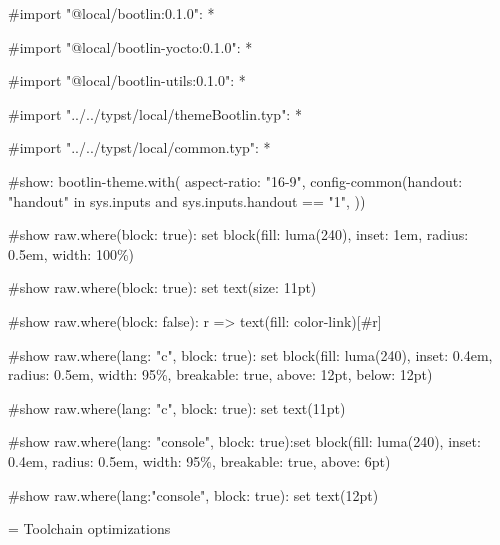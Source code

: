#import "@local/bootlin:0.1.0": *

#import "@local/bootlin-yocto:0.1.0": *

#import "@local/bootlin-utils:0.1.0": *

#import "../../typst/local/themeBootlin.typ": *

#import "../../typst/local/common.typ": *

#show: bootlin-theme.with( aspect-ratio: "16-9", config-common(handout: "handout" in sys.inputs and sys.inputs.handout == "1", ))

#show raw.where(block: true): set block(fill: luma(240), inset: 1em, radius: 0.5em, width: 100\%)

#show raw.where(block: true): set text(size: 11pt)

#show raw.where(block: false): r => text(fill: color-link)[#r]

#show raw.where(lang: "c", block: true): set block(fill: luma(240), inset: 0.4em, radius: 0.5em, width: 95\%, breakable: true, above: 12pt, below: 12pt)

#show raw.where(lang: "c", block: true): set text(11pt)

#show raw.where(lang: "console", block: true):set block(fill: luma(240), inset: 0.4em, radius: 0.5em, width: 95\%, breakable: true, above: 6pt)

#show raw.where(lang:"console", block: true): set text(12pt)

 = Toolchain optimizations


